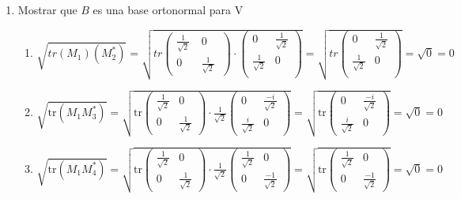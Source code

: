\documentclass{report}
\begin{document}
\begin{enumerate}
    
    
    \begin{enumerate}[label=\alph*)]
        \item Mostrar que $B$ es una base ortonormal para V
                \begin{enumerate}
                    \item  $\sqrt{tr(M_1)(M_2^*)}=\sqrt{tr\begin{pmatrix}
    \frac{1}{\sqrt{2}}\ & 0\\
    0 & \frac{1}{\sqrt{2}}\
    \end{pmatrix} \cdot \begin{pmatrix}
    0 & \frac{1}{\sqrt{2}}\\
    \frac{1}{\sqrt{2}} & 0\\
    \end{pmatrix}}=\sqrt{tr\begin{pmatrix}
    0 & \frac{1}{\sqrt{2}}\\
    \frac{1}{\sqrt{2}} & 0\\
    \end{pmatrix}}=\sqrt{0}=0 $
    
    
    
    
     
    \item $\sqrt{\text{tr}(M_1 M_3^*)} = \sqrt{\text{tr} \begin{pmatrix}
    \frac{1}{\sqrt{2}} & 0\\
    0 & \frac{1}{\sqrt{2}}
    \end{pmatrix} \cdot \frac{1}{\sqrt{2}}\begin{pmatrix}
    0 & \frac{-i}{\sqrt{2}}\\
    \frac{i}{\sqrt{2}} & 0
    \end{pmatrix}  }= \sqrt{\text{tr}  \begin{pmatrix}
    0 & \frac{-i}{\sqrt{2}}\\
    \frac{i}{\sqrt{2}} & 0
    \end{pmatrix} } = \sqrt{0} = 0 $
    
    
    
    
    
    
    
    
    \item $\sqrt{\text{tr}(M_1 M_4^*)} = \sqrt{\text{tr}  \begin{pmatrix}
    \frac{1}{\sqrt{2}} & 0\\
    0 & \frac{1}{\sqrt{2}}
    \end{pmatrix} \cdot \frac{1}{\sqrt{2}}\begin{pmatrix}
    \frac{1}{\sqrt{2}} & 0\\
    0 & \frac{-1}{\sqrt{2}}
    \end{pmatrix}}= \sqrt{\text{tr}   \begin{pmatrix}
    \frac{1}{\sqrt{2}} & 0\\
    0 & \frac{-1}{\sqrt{2}}
    \end{pmatrix}} = \sqrt{0} = 0 $
    

\end{enumerate}
\end{enumerate}
\end{enumerate}
\end{document}
